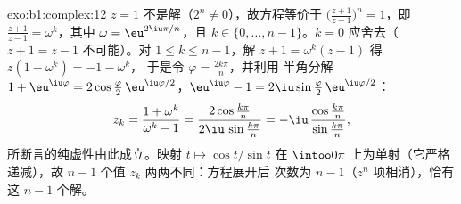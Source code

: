 \begin{solution}{exo:b1:complex:12}
$z = 1$ 不是解（$2^n \neq 0$），故方程等价于
$\bigl(\frac{z+1}{z-1}\bigr)^n = 1$，即\
$\frac{z+1}{z-1} = \omega^k$，其中 $\omega = \eu^{2\iu\pi/n}$，且
$k \in \{0, \dots, n-1\}$。$k = 0$ 应舍去（$z + 1 =
z - 1$ 不可能）。对 $1 \leq k \leq n - 1$，解
$z + 1 = \omega^k(z - 1)$ 得 $z(1 - \omega^k) = -1 - \omega^k$，
于是令 $\varphi = \frac{2k\pi}{n}$，并利用
半角分解 $1 + \eu^{\iu\varphi} = 2\cos\frac\varphi2\,
\eu^{\iu\varphi/2}$，$\eu^{\iu\varphi} - 1 = 2\iu\sin\frac\varphi2
\,\eu^{\iu\varphi/2}$：
\[
z_k = \frac{1 + \omega^k}{\omega^k - 1}
= \frac{2\cos\frac{k\pi}{n}}{2\iu\,\sin\frac{k\pi}{n}}
= -\iu\,\frac{\cos\frac{k\pi}{n}}{\sin\frac{k\pi}{n}} ,
\]
所断言的纯虚性由此成立。映射 $t \mapsto \cos t/\sin t$
在 $\intoo0\pi$ 上为单射（它严格递减），故
$n - 1$ 个值 $z_k$ 两两不同：方程展开后
次数为 $n - 1$（$z^n$ 项相消），恰有这
$n - 1$ 个解。
\end{solution}

